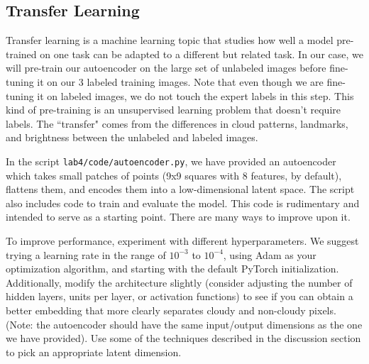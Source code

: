 \documentclass[letterpaper,12pt]{article}
\begin{document}
\subsection{Transfer Learning}

Transfer learning is a machine learning topic that studies how well a model pre-trained on one task can be adapted to a different but related task. In our case, we will pre-train our autoencoder on the large set of unlabeled images before fine-tuning it on our 3 labeled training images. Note that even though we are fine-tuning it on labeled images, we do not touch the expert labels in this step. This kind of pre-training is an unsupervised learning problem that doesn't require labels. The ``transfer" comes from the differences in cloud patterns, landmarks, and brightness between the unlabeled and labeled images.

In the script \texttt{lab4/code/autoencoder.py}, we have provided an autoencoder which takes small patches of points (9x9 squares with 8 features, by default), flattens them, and encodes them into a low-dimensional latent space. The script also includes code to train and evaluate the model. This code is rudimentary and intended to serve as a starting point. There are many ways to improve upon it.

To improve performance, experiment with different hyperparameters. We suggest trying a learning rate in the range of $10^{-3}$ to $10^{-4}$, using Adam as your optimization algorithm, and starting with the default PyTorch initialization.  
Additionally, modify the architecture slightly (consider adjusting the number of hidden layers, units per layer, or activation functions) to see if you can obtain a better embedding that more clearly separates cloudy and non-cloudy pixels. 
(Note: the autoencoder should have the same input/output dimensions as the one we have provided). 
Use some of the techniques described in the discussion section to pick an appropriate latent dimension.
\end{document}
